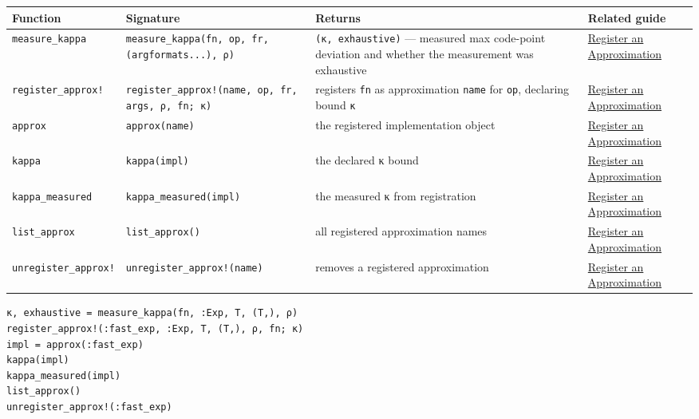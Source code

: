 \begin{table}[h]
\centering
\begin{tabulary}{\linewidth}{L L L L}
\toprule
Function & Signature & Returns & Related guide \\
\toprule
\texttt{measure\_\allowbreak{}kappa} & \texttt{measure\_\allowbreak{}kappa(\allowbreak{}fn, op, fr, (\allowbreak{}argformats...), ρ)} & \texttt{(κ, exhaustive)} — measured max code-point deviation and whether the measurement was exhaustive & \href{workflow\_\allowbreak{}approximation.md}{Register an Approximation} \\
\texttt{register\_\allowbreak{}approx!} & \texttt{register\_\allowbreak{}approx!(\allowbreak{}name, op, fr, args, ρ, fn; κ)} & registers \texttt{fn} as approximation \texttt{name} for \texttt{op}, declaring bound \texttt{κ} & \href{workflow\_\allowbreak{}approximation.md}{Register an Approximation} \\
\texttt{approx} & \texttt{approx(name)} & the registered implementation object & \href{workflow\_\allowbreak{}approximation.md}{Register an Approximation} \\
\texttt{kappa} & \texttt{kappa(impl)} & the declared κ bound & \href{workflow\_\allowbreak{}approximation.md}{Register an Approximation} \\
\texttt{kappa\_\allowbreak{}measured} & \texttt{kappa\_\allowbreak{}measured(impl)} & the measured κ from registration & \href{workflow\_\allowbreak{}approximation.md}{Register an Approximation} \\
\texttt{list\_\allowbreak{}approx} & \texttt{list\_\allowbreak{}approx()} & all registered approximation names & \href{workflow\_\allowbreak{}approximation.md}{Register an Approximation} \\
\texttt{unregister\_\allowbreak{}approx!} & \texttt{unregister\_\allowbreak{}approx!(\allowbreak{}name)} & removes a registered approximation & \href{workflow\_\allowbreak{}approximation.md}{Register an Approximation} \\
\bottomrule
\end{tabulary}

\end{table}




\begin{verbatim}
κ, exhaustive = measure_kappa(fn, :Exp, T, (T,), ρ)
register_approx!(:fast_exp, :Exp, T, (T,), ρ, fn; κ)
impl = approx(:fast_exp)
kappa(impl)
kappa_measured(impl)
list_approx()
unregister_approx!(:fast_exp)
\end{verbatim}



